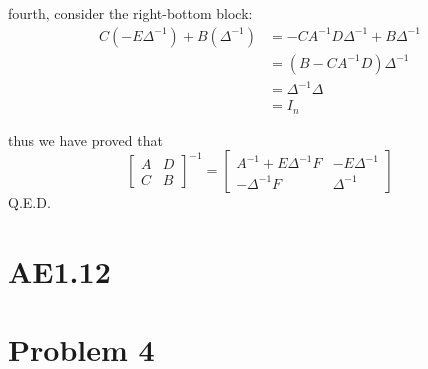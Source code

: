 \documentclass[12pt,a4paper]{article}
\begin{document}
fourth, consider the right-bottom block:
\[
    \begin{aligned}
        C(-E\Delta^{-1}) + B(\Delta^{-1}) & = -CA^{-1}D\Delta^{-1} + B\Delta^{-1} \\
                                          & = (B - CA^{-1}D)\Delta^{-1} \\
                                          & = \Delta^{-1}\Delta \\
                                        & = I_n
    \end{aligned}
\]

thus we have proved that
\[
    \begin{bmatrix}
        A & D \\
        C & B
    \end{bmatrix}^{-1} = \begin{bmatrix}
        A^{-1}+E\Delta^{-1}F & -E\Delta^{-1} \\
        -\Delta^{-1}F & \Delta^{-1}
    \end{bmatrix}
\]
Q.E.D.

\section{AE1.12}

\section{Problem 4}
\end{document}
